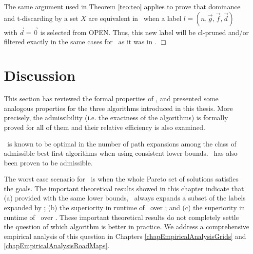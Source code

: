 \begin{demo}
The same argument used in Theorem \ref{teo:teo} applies to prove that dominance and t-discarding by a set $X$ are equivalent in \lexgote \ when a  label $l = (n, \vec g, \vec f, \vec d)$ with $\vec d= \vec 0$ is selected from OPEN. Thus, this new label will be cl-pruned and/or filtered exactly in the same cases for \lexgote \ as it was in \lexgo. $\Box$
\end{demo}

\section{Discussion}
\label{chapFormalAnalysis:sec:discussion}

This section has reviewed the formal properties of \namoa, and presented some analogous properties for the three algorithms introduced in this thesis. More precisely, the admissibility (i.e. the exactness of the algorithms) is formally proved for all of them and their relative efficiency is also examined.

\namoa \ is known to be optimal in the number of path expansions among the class of admissible best-first algorithms when using consistent lower bounds. \lexgo \ has also been proven to be admissible. 

The worst case scenario for \lexgo \ is when the whole Pareto set of solutions satisfies the goals. The important theoretical results showed in this chapter indicate that (a) provided with the same lower bounds, \lexgo \ always expands a subset of the labels expanded by \namoa ; (b) the superiority in runtime of \namoate \ over \namoa ; and (c) the superiority in runtime of \lexgote \ over \lexgo. These important theoretical results do not completely settle the question of which algorithm is better in practice. We address a comprehensive empirical analysis of this question in Chapters \ref{chapEmpiricalAnalysisGrids} and \ref{chapEmpiricalAnalysisRoadMaps}.

